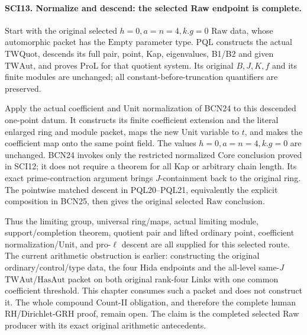 \paragraph{SCI13. Normalize and descend: the selected Raw endpoint is complete.}
\label{claim:SCI13}
Start with the original selected \(h=0,a=n=4,k.g=0\)
\(\mathrm{Raw}\) data, whose automorphic packet has the
\(\mathrm{Empty}\) parameter type. PQL constructs the actual
\(\mathrm{TWQuot}\), descends its full pair, point, Kap,
eigenvalues, B1/B2 and given \(\mathrm{TWAut}\), and proves
\(\mathrm{ProL}\) for that quotient system. Its original
\(B,J,K,f\) and its finite modules are unchanged; all
constant-before-truncation quantifiers are preserved.

Apply the actual coefficient and Unit normalization of BCN24
to this descended one-point datum. It constructs its finite
coefficient extension and the literal enlarged ring and module
packet, maps the new Unit variable to \(t\), and makes the
coefficient map onto the same point field. The values
\(h=0,a=n=4,k.g=0\) are unchanged. BCN24 invokes only the
restricted normalized Core conclusion proved in SCI12; it
does not require a theorem for all Kap or arbitrary chain length.
Its exact prime-contraction argument brings \(J\)-containment
back to the original ring. The pointwise matched descent in
PQL20--PQL21, equivalently the explicit composition in BCN25,
then gives the original selected \(\mathrm{Raw}\) conclusion.

Thus the limiting group, universal ring/maps, actual limiting
module, support/completion theorem, quotient pair and lifted
ordinary point, coefficient normalization/Unit, and pro-\(\ell\)
descent are all supplied for this selected route. The current
arithmetic obstruction is earlier: constructing the original
ordinary/control/type data, the four Hida endpoints and the
all-level same-\(J\) \(\mathrm{TWAut}\)/\(\mathrm{HasAut}\)
packet on both original rank-four Links with one common
coefficient threshold. This chapter consumes such a packet and
does not construct it. The whole compound Count-II obligation,
and therefore the complete human RH/Dirichlet-GRH proof, remain
open. The claim is the completed selected Raw producer with
its exact original arithmetic antecedents.
